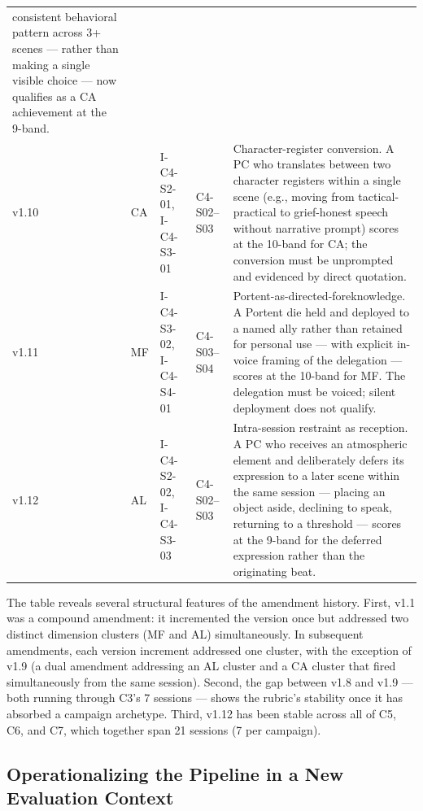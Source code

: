 \begin{table}[t]
\begin{tabular}{@{}p{0.9cm}p{1.2cm}p{3.0cm}p{3.2cm}p{5.0cm}@{}}
  consistent behavioral pattern across 3+ scenes --- rather than making a single
  visible choice --- now qualifies as a CA achievement at the 9-band. \\
\addlinespace[2pt]
v1.10 & CA & I-C4-S2-01, I-C4-S3-01 & C4-S02--S03 & Character-register
  conversion. A PC who translates between two character registers within a single
  scene (e.g., moving from tactical-practical to grief-honest speech without
  narrative prompt) scores at the 10-band for CA; the conversion must be
  unprompted and evidenced by direct quotation. \\
\addlinespace[2pt]
v1.11 & MF & I-C4-S3-02, I-C4-S4-01 & C4-S03--S04 & Portent-as-directed-fore\-knowledge.
  A Portent die held and deployed to a named ally rather than retained for personal
  use --- with explicit in-voice framing of the delegation --- scores at the 10-band
  for MF. The delegation must be voiced; silent deployment does not qualify. \\
\addlinespace[2pt]
v1.12 & AL & I-C4-S2-02, I-C4-S3-03 & C4-S02--S03 & Intra-session restraint as
  reception. A PC who receives an atmospheric element and deliberately defers its
  expression to a later scene within the same session --- placing an object aside,
  declining to speak, returning to a threshold --- scores at the 9-band for the
  deferred expression rather than the originating beat. \\
\bottomrule
\end{tabular}
\end{table}

The table reveals several structural features of the amendment history.
First, v1.1 was a compound amendment: it incremented the version once but
addressed two distinct dimension clusters (MF and AL) simultaneously. In
subsequent amendments, each version increment addressed one cluster, with
the exception of v1.9 (a dual amendment addressing an AL cluster and a
CA cluster that fired simultaneously from the same session). Second, the
gap between v1.8 and v1.9 --- both running through C3's 7 sessions --- shows
the rubric's stability once it has absorbed a campaign archetype. Third,
v1.12 has been stable across all of C5, C6, and C7, which together span
21 sessions (7 per campaign).

\subsection{Operationalizing the Pipeline in a New Evaluation Context}

